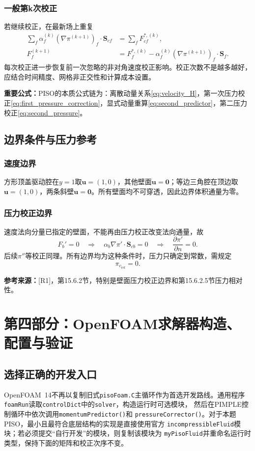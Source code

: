 \documentclass[UTF8,12pt,a4paper]{ctexart}
\numberwithin{equation}{section}
\newcommand{\Rone}{\textnormal{[R1]}}
\newcommand{\source}[1]{\par\smallskip\noindent\colorbox{sourcebg}{%
  \parbox{0.955\linewidth}{\footnotesize\color{sourcegray}\textbf{参考来源：}#1}}\par\smallskip}
\newcommand{\keytitle}[1]{\par\smallskip\noindent\colorbox{keybg}{%
  \parbox{0.965\linewidth}{\color{keyblue}\textbf{重要公式：}#1}}\par\smallskip}
\begin{document}
\subsubsection{一般第k次校正}
若继续校正，在最新场上重复
\begin{align}
  \sum_f\alpha_f^{(k)}(\nabla\pi^{(k+1)})_f\cdot\bm S_{cf}
  &=\sum_fF_{cf}^{*,(k)},\\
  F_f^{(k+1)}
  &=F_f^{*,(k)}
  -\alpha_f^{(k)}(\nabla\pi^{(k+1)})_f\cdot\bm S_f.
\end{align}
每次校正进一步恢复前一次忽略的非对角速度校正影响。校正次数不是越多越好，应结合时间精度、网格非正交性和计算成本设置。

\keytitle{PISO的本质公式链为：离散动量关系\eqref{eq:velocity_H}，第一次压力校正\eqref{eq:first_pressure_correction}，显式动量重算\eqref{eq:second_predictor}，第二压力校正\eqref{eq:second_pressure}。}

\subsection{边界条件与压力参考}
\subsubsection{速度边界}
方形顶盖驱动腔在$y=1$取$\bm u=(1,0)$，其他壁面$\bm u=\bm0$；等边三角腔在顶边取$\bm u=(1,0)$，两条斜壁$\bm u=\bm0$。所有壁面均不可穿透，因此边界体积通量为零。

\subsubsection{压力校正边界}
速度法向分量已指定的壁面，不能再由压力校正改变法向通量，故
\begin{equation}
  F_b'=0
  \quad\Longrightarrow\quad
  \alpha_b\nabla\pi'\cdot\bm S_{cb}=0
  \quad\Longrightarrow\quad
  \boxed{\frac{\partial\pi'}{\partial n}=0.}
\end{equation}
后续$\pi''$等校正同理。所有边界均为这种条件时，压力只确定到常数，需规定
\begin{equation}
  \boxed{\pi_{c_{\mathrm{ref}}}=0.}
  \label{eq:pref}
\end{equation}
\source{\Rone，第15.6.2节，特别是壁面压力校正边界和第15.6.2.5节压力相对性。}

\section{第四部分：OpenFOAM求解器构造、配置与验证}
\subsection{选择正确的开发入口}
OpenFOAM~14不再以复制旧式\texttt{pisoFoam.C}主循环作为首选开发路线。通用程序
\texttt{foamRun}读取\texttt{controlDict}中的\texttt{solver}，构造运行时可选模块，
然后在PIMPLE控制循环中依次调用\texttt{momentumPredictor()}和
\texttt{pressureCorrector()}。对于本题PISO，最小且最符合底层结构的实现是直接使用官方
\texttt{incompressibleFluid}模块；若必须提交“自行开发”的模块，则复制该模块为
\texttt{myPisoFluid}并重命名运行时类型，保持下面的矩阵和校正次序不变。
\end{document}
